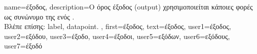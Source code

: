 {name={\foreignlanguage{greek}{έξοδος}},
	description={\foreignlanguage{greek}{Ο όρος έξοδος} (output) \foreignlanguage{greek}{χρησιμοποιείται 
		κάποιες φορές ως συνώνυμο της}  \foreignlanguage{greek}{ενός}  \cite{Murphy2012}.
		\\
		\foreignlanguage{greek}{Βλέπε επίσης:} \gls{label}, \gls{datapoint}. },  
 	first={\foreignlanguage{greek}{έξοδος}}, 
 	text={\foreignlanguage{greek}{έξοδος}},
	user1={\foreignlanguage{greek}{έξοδος}}, %
  	user2={\foreignlanguage{greek}{εξόδου}}, %
	user3={\foreignlanguage{greek}{έξοδο}}, %
	user4={\foreignlanguage{greek}{έξοδοι}}, %
  	user5={\foreignlanguage{greek}{εξόδων}}, %
	user6={\foreignlanguage{greek}{εξόδους}}, %
	user7={\foreignlanguage{greek}{έξοδό}} %
}


